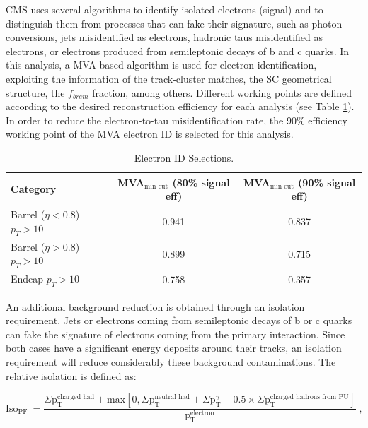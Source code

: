 \noindent CMS uses several algorithms to identify isolated electrons (signal) and to distinguish
them from processes that can fake their signature, such as photon conversions, jets 
misidentified as electrons,  hadronic taus misidentified as electrons, or electrons 
produced from semileptonic decays of b and c quarks. In this analysis, a MVA-based
algorithm is used for electron identification, exploiting  the information of the
track-cluster matches, the SC geometrical structure, the $f_{brem}$ fraction, among others. 
Different working points are defined according to the desired reconstruction efficiency for 
each analysis (see Table \ref{eIDtable}). In order to reduce the electron-to-tau 
misidentification rate, the 90$\%$ efficiency working point of the MVA 
electron ID is selected for this analysis.

\begin{table}[ht]                                                                                                                              
\begin{center}
 \caption{Electron ID Selections.\label{eIDtable}}
 \begin{tabular}{| l | c | c | }
 \hline\hline
       Category                             & MVA$_{\textrm{min cut}}$ (80\% signal eff)    & MVA$_{\textrm{min cut}}$ (90\% signal eff)  \\ \hline 
       Barrel ($\eta < 0.8$) $p_{T}>10$     & 0.941                                         & 0.837                     \\
       Barrel ($\eta > 0.8$) $p_{T}>10$     & 0.899                                         & 0.715                     \\
       Endcap $p_{T}>10$                    & 0.758                                         & 0.357                     \\
 \hline
 \hline
 \end{tabular}
\end{center}
\end{table}

\noindent An additional background reduction is obtained through an isolation requirement. Jets or
electrons coming from semileptonic decays of b or c quarks can fake the signature 
of electrons coming from the primary interaction. Since both cases have a significant
energy deposits around their tracks, an isolation requirement will reduce considerably 
these background contaminations. The relative isolation is defined as:

\begin{equation}
\text{Iso}_{\text{PF}}~= \frac{ \Sigma \text{p}_\text{T}^{\text{charged had}} + \text{max}[0, \Sigma \text{p}_\text{T}^{\text{neutral had}}
+ \Sigma \text{p}_\text{T}^{\gamma} - 0.5 \times \Sigma \text{p}_\text{T}^{\text{charged hadrons from PU}}]}{\text{p}_\text{T}^{\text{electron}}} \;,
\end{equation}

